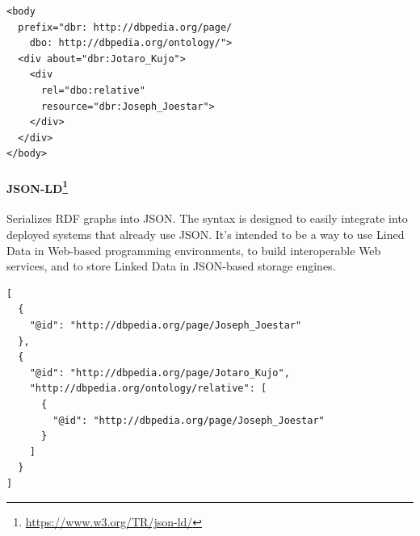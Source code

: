 \begin{verbatim}
<body
  prefix="dbr: http://dbpedia.org/page/
    dbo: http://dbpedia.org/ontology/">
  <div about="dbr:Jotaro_Kujo">
    <div
      rel="dbo:relative"
      resource="dbr:Joseph_Joestar">
    </div>
  </div>
</body>  
\end{verbatim}

\paragraph*{JSON-LD\footnote{\url{https://www.w3.org/TR/json-ld/}}} Serializes \ac{RDF} graphs into \ac{JSON}. The syntax is designed to easily integrate into deployed systems that already use \ac{JSON}. It's intended to be a way to use Lined Data in Web-based programming environments, to build interoperable Web services, and to store Linked Data in \ac{JSON}-based storage engines.

\begin{verbatim}
[
  {
    "@id": "http://dbpedia.org/page/Joseph_Joestar"
  },
  {
    "@id": "http://dbpedia.org/page/Jotaro_Kujo",
    "http://dbpedia.org/ontology/relative": [
      {
        "@id": "http://dbpedia.org/page/Joseph_Joestar"
      }
    ]
  }
]
\end{verbatim}